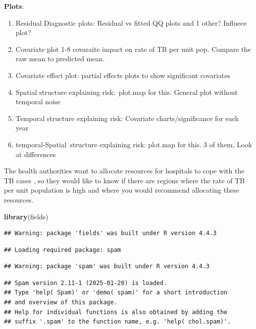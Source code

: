 \documentclass[
  11pt,
  a4paper,11pt]{article}
\newenvironment{Shaded}{\begin{snugshade}}{\end{snugshade}}
\newcommand{\FunctionTok}[1]{\textcolor[rgb]{0.13,0.29,0.53}{\textbf{#1}}}
\newcommand{\NormalTok}[1]{#1}
\begin{document}
\textbf{Plots}:

\begin{enumerate}
\def\labelenumi{\arabic{enumi}.}
\item
  Residual Diagnostic plots: Residual vs fitted QQ plots and 1 other?
  Influece plot?
\item
  Covariate plot 1-8 covaraite impact on rate of TB per unit pop.
  Compare the raw mean to predicted mean.
\item
  Covariate effect plot: partial effects plots to show significant
  covariates
\item
  Spatial structure explaining risk:~plot.map for this. General plot
  without temporal noise
\item
  Temporal structure explaining risk: Covariate charts/significance for
  each year
\item
  temporal-Spatial~structure explaining risk: plot.map for this. 3 of
  them, Look at differences
\end{enumerate}

The health authorities want to allocate resources for hospitals to cope
with the TB cases , so they would like to know if there are regions
where the rate of TB per unit population is high and where you would
recommend allocating these resources.

\begin{Shaded}
\begin{Highlighting}[]
 \FunctionTok{library}\NormalTok{(fields)}
\end{Highlighting}
\end{Shaded}

\begin{verbatim}
## Warning: package 'fields' was built under R version 4.4.3
\end{verbatim}

\begin{verbatim}
## Loading required package: spam
\end{verbatim}

\begin{verbatim}
## Warning: package 'spam' was built under R version 4.4.3
\end{verbatim}

\begin{verbatim}
## Spam version 2.11-1 (2025-01-20) is loaded.
## Type 'help( Spam)' or 'demo( spam)' for a short introduction 
## and overview of this package.
## Help for individual functions is also obtained by adding the
## suffix '.spam' to the function name, e.g. 'help( chol.spam)'.
\end{verbatim}
\end{document}
